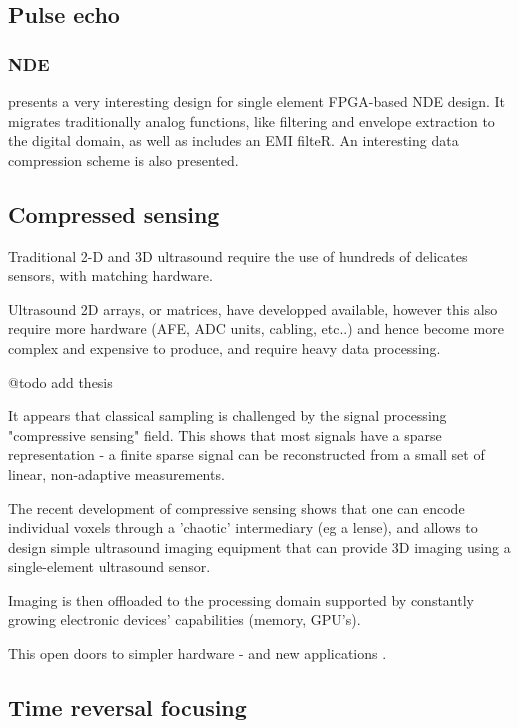 \documentclass[conference]{IEEEtran}
\begin{document}
\subsection{Pulse echo}


\subsubsection{NDE}

\cite{fritsch_full_nodate} presents a very interesting design for single element FPGA-based NDE design. It migrates traditionally analog functions, like filtering and envelope extraction to   the   digital   domain, as well as includes an EMI filteR. An interesting data compression scheme is also presented.


\subsection{Compressed sensing}

Traditional 2-D and 3D ultrasound require the use of hundreds of delicates sensors, with matching hardware. 

Ultrasound 2D arrays, or matrices, have developped available, however this also require more hardware (AFE, ADC units, cabling, etc..) and hence become more
complex and expensive to produce, and require heavy data processing.

@todo add \cite{Fedjajevs_mscthesis_14_09_2016} thesis

It appears that classical sampling is challenged by the signal processing "compressive sensing" field. This shows that most signals have a sparse representation - a finite sparse signal can be reconstructed from a small set of linear, non-adaptive measurements.

The recent development of compressive sensing shows that one can encode individual voxels through a 'chaotic' intermediary (eg a lense), and allows to design simple ultrasound imaging equipment that can provide 3D imaging using a single-element ultrasound sensor.  

Imaging is then offloaded to the processing domain supported by constantly growing electronic devices' capabilities (memory, GPU's).


This open doors to simpler hardware - and new applications \cite{kruizinga_compressive_2017}.


\cite{hua_compressed_2011}

\subsection{Time reversal focusing}
\end{document}
